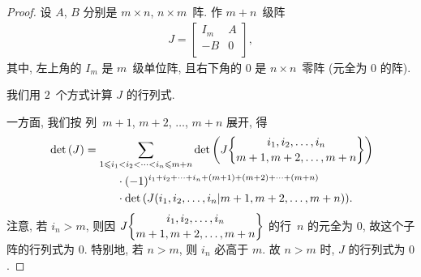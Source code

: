\documentclass[../libro.tex]{subfiles}
\begin{document}
\begin{proof}
    设 \(A\), \(B\) 分别是
    \(m \times n\), \(n \times m\)~阵.
    作 \(m + n\)~级阵
    \begin{align*}
        J =
        \begin{bmatrix}
            I_m & A \\
            -B  & 0 \\
        \end{bmatrix},
    \end{align*}
    其中, 左上角的 \(I_m\) 是 \(m\)~级单位阵,
    且右下角的 \(0\) 是 \(n \times n\)~零阵
    (元全为 \(0\) 的阵).

    我们用 \(2\)~个方式计算 \(J\) 的行列式.

    一方面, 我们按%
    列~\(m + 1\), \(m + 2\), \(\dots\), \(m + n\) 展开,
    得
    \begin{align*}
        &
        \det {(J)}
        = \sum_{1 \leq i_1 < i_2 < \dots < i_n \leq m+n}
        {\det {\left(
                    J\submat{i_1,i_2,\dots,i_n}{m+1,m+2,\dots,m+n}
        \right)}}
        \\
        &
        \qquad \qquad \qquad
        \cdot (-1)^{i_1 + i_2 + \dots + i_n
        + (m+1) + (m+2) + \dots + (m+n)}
        \\
        &
        \qquad \qquad \qquad
        \cdot \det {(J({i_1,i_2,\dots,i_n}|{m+1,m+2,\dots,m+n}))}.
    \end{align*}
    注意, 若 \(i_n > m\), 则因
    \(J\submat{i_1,i_2,\dots,i_n}{m+1,m+2,\dots,m+n}\)
    的行~\(n\) 的元全为 \(0\),
    故这个子阵的行列式为 \(0\).
    特别地, 若 \(n > m\), 则 \(i_n\) 必高于 \(m\).
    故 \(n > m\) 时, \(J\) 的行列式为 \(0\).


\end{proof}
\end{document}

